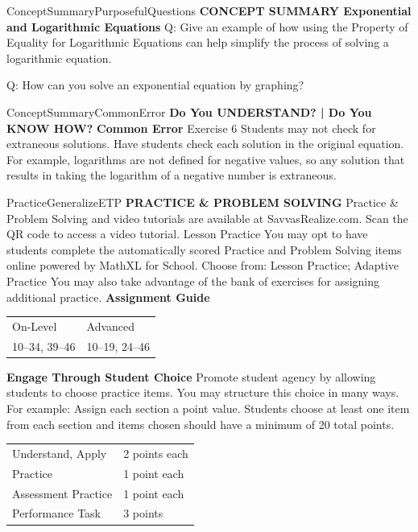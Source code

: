 \documentclass{article}
\newenvironment{te-addendum}[2]{}{}     %
\newcommand{\answer}[1]{}               %
\begin{document}
\begin{te-addendum}{ConceptSummary}{PurposefulQuestions}
\textbf{CONCEPT SUMMARY Exponential and Logarithmic Equations}
Q: Give an example of how using the Property of Equality for Logarithmic Equations can help simplify the process of solving a logarithmic equation.
\answer{It can allow you to transform the equation into a factorable quadratic equation.}
Q: How can you solve an exponential equation by graphing?
\answer{Set each side of the equation equal to y and graph the functions. Then look for any points of intersection on the graphs.}
\end{te-addendum}
\begin{te-addendum}{ConceptSummary}{CommonError}
\textbf{Do You UNDERSTAND? | Do You KNOW HOW?}
\textbf{Common Error}
Exercise 6 Students may not check for extraneous solutions. Have students check each solution in the original equation. For example, logarithms are not defined for negative values, so any solution that results in taking the logarithm of a negative number is extraneous.
\end{te-addendum}
\begin{te-addendum}{Practice}{GeneralizeETP}
\textbf{PRACTICE \& PROBLEM SOLVING}
Practice \& Problem Solving and video tutorials are available at SavvasRealize.com.
Scan the QR code to access a video tutorial.
Lesson Practice You may opt to have students complete the automatically scored Practice and Problem Solving items online powered by MathXL for School.
Choose from: Lesson Practice; Adaptive Practice
You may also take advantage of the bank of exercises for assigning additional practice.
\textbf{Assignment Guide}
\begin{tabular}{ll}
On-Level & Advanced \\
10--34, 39--46 & 10--19, 24--46 \\
\end{tabular}
\textbf{Engage Through Student Choice}
Promote student agency by allowing students to choose practice items. You may structure this choice in many ways.
For example:
Assign each section a point value. Students choose at least one item from each section and items chosen should have a minimum of 20 total points.
\begin{tabular}{ll}
Understand, Apply & 2 points each \\
Practice & 1 point each \\
Assessment Practice & 1 point each \\
Performance Task & 3 points \\
\end{tabular}
\end{te-addendum}
\end{document}
